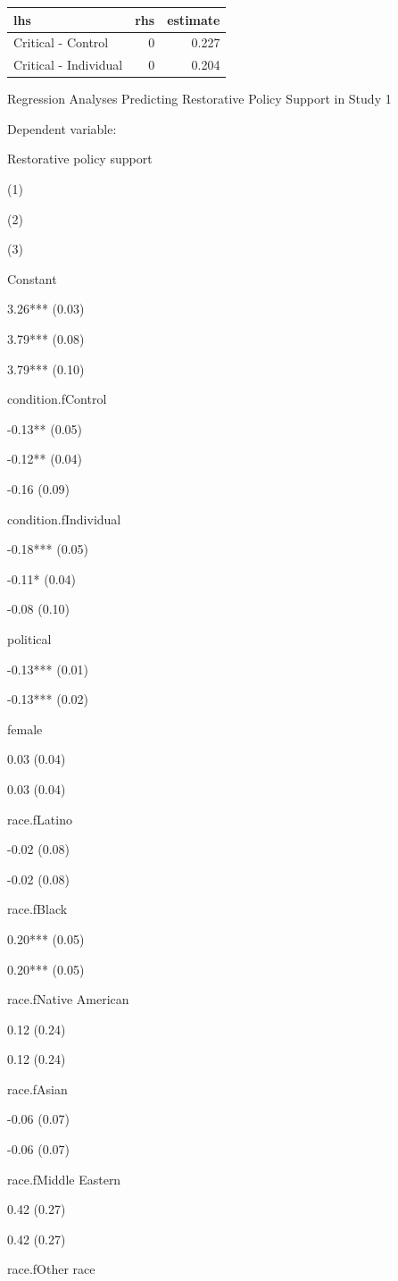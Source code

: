 \documentclass[
]{book}
\begin{document}
\begin{tabular}{l|r|r}
\hline
lhs & rhs & estimate\\
\hline
Critical - Control & 0 & 0.227\\
\hline
Critical - Individual & 0 & 0.204\\
\hline
\end{tabular}

Regression Analyses Predicting Restorative Policy Support in Study 1

Dependent variable:

Restorative policy support

(1)

(2)

(3)

Constant

3.26*** (0.03)

3.79*** (0.08)

3.79*** (0.10)

condition.fControl

-0.13** (0.05)

-0.12** (0.04)

-0.16 (0.09)

condition.fIndividual

-0.18*** (0.05)

-0.11* (0.04)

-0.08 (0.10)

political

-0.13*** (0.01)

-0.13*** (0.02)

female

0.03 (0.04)

0.03 (0.04)

race.fLatino

-0.02 (0.08)

-0.02 (0.08)

race.fBlack

0.20*** (0.05)

0.20*** (0.05)

race.fNative American

0.12 (0.24)

0.12 (0.24)

race.fAsian

-0.06 (0.07)

-0.06 (0.07)

race.fMiddle Eastern

0.42 (0.27)

0.42 (0.27)

race.fOther race
\end{document}
